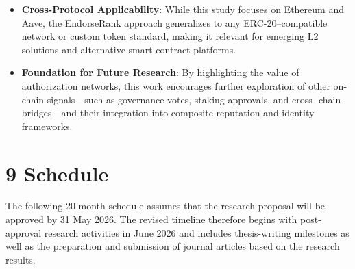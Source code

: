 \documentclass[12pt]{article}
\begin{document}
\begin{itemize}
\item[\textbullet] \textbf{Cross-Protocol Applicability}: While this study focuses on Ethereum and Aave, the EndorseRank approach generalizes to any ERC-20--compatible network or custom token standard, making it relevant for emerging L2 solutions and alternative smart-contract platforms.
\item[\textbullet] \textbf{Foundation for Future Research}: By highlighting the value of authorization networks, this work encourages further exploration of other on-chain signals---such as governance votes, staking approvals, and cross- chain bridges---and their integration into composite reputation and identity frameworks.
\end{itemize}
\clearpage
{}
\section*{9 \textbf{Schedule}}
\label{sec:schedule}

The following 20-month schedule assumes that the research proposal will be approved by 31 May 2026. The revised timeline therefore begins with post-approval research activities in June 2026 and includes thesis-writing milestones as well as the preparation and submission of journal articles based on the research results.
\end{document}

